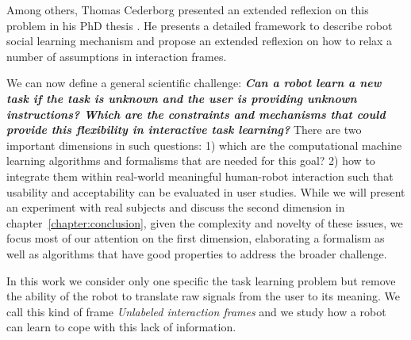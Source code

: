 Among others, Thomas Cederborg presented an extended reflexion on this problem in his PhD thesis   . He presents a detailed framework to describe robot social learning mechanism \cite{cederborg2013language} and propose an extended reflexion on how to relax a number of assumptions in interaction frames. 



We can now define a general scientific challenge: \textbf{\textit{Can a robot learn a new task if the task is unknown and the user is providing unknown instructions? Which are the constraints and mechanisms that could provide this flexibility in interactive task learning?}} There are two important dimensions in such questions: 1) which are the computational machine learning algorithms and formalisms that are needed for this goal? 2) how to integrate them within real-world meaningful human-robot interaction such that usability and acceptability can be evaluated in user studies. While we will present an experiment with real subjects and discuss the second dimension in chapter~\ref{chapter:conclusion}, given the complexity and novelty of these issues, we focus most of our attention on the first dimension, elaborating a formalism as well as algorithms that have good properties to address the broader challenge.

In this work we consider only one specific the task learning problem but remove the ability of the robot to translate raw signals from the user to its meaning. We call this kind of frame \emph{Unlabeled interaction frames} and we study how a robot can learn to cope with this lack of information.

